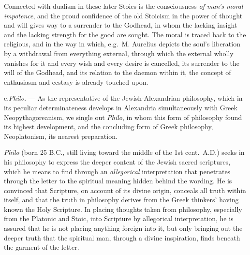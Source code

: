 Connected with dualism in these later Stoics is the consciousness
\emph{of man's moral impotence}, and the proud confidence of the old
Stoicism in the power of thought and will gives way to a surrender to
the Godhead, in whom the lacking insight and the lacking strength for
the good are sought. The moral is traced back to the religious, and in
the way in which, e.g.\ M. Aurelius depicts the soul's liberation by a
withdrawal from everything external, through which the external wholly
vanishes for it and every wish and every desire is cancelled, its
surrender to the will of the Godhead, and its relation to the daemon
within it, the concept of enthusiasm and ecstasy is already touched
upon.

\divrule

e.\enspace \emph{Philo.} --- As the representative of the
Jewish-Alexandrian philosophy, which in its peculiar determinateness
develops in Alexandria simultaneously with Greek Neopythagoreanism, we
single out \emph{Philo}, in whom this form of philosophy found its
highest development, and the concluding form of Greek philosophy,
Neoplatonism, its nearest preparation.

\emph{Philo} (born 25 B.C., still living toward the middle of the 1st
cent.\ A.D.) seeks in his philosophy to express the deeper content of
the Jewish sacred scriptures, which he means to find through an
\emph{allegorical} interpretation that penetrates through the letter to
the spiritual meaning hidden behind the wording. He is convinced that
Scripture, on account of its divine origin, conceals all truth within
itself, and that the truth in philosophy derives from the Greek
thinkers' having
known the Holy Scripture. In placing thoughts taken from
philosophy, especially from the Platonic and Stoic, into Scripture by
allegorical interpretation, he is assured that he is not placing
anything foreign into it, but only bringing out the deeper truth that
the spiritual man, through a divine inspiration, finds beneath the
garment of the letter.

